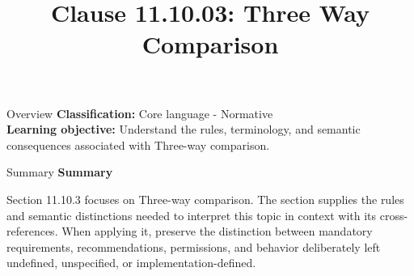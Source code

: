 \documentclass[10pt,letterpaper]{article}
\title{Clause 11.10.03: Three Way Comparison}
\author{}
\date{}
\begin{document}
\maketitle
\begin{CornellOverviewBox}{Overview}
\textbf{Classification:} Core language - Normative\\[2pt]
\textbf{Learning objective:} Understand the rules, terminology, and semantic consequences associated with Three-way comparison.
\end{CornellOverviewBox}\begin{CornellSummaryBox}{Summary}
{\sffamily\bfseries\color{Accent} Summary}\par\vspace{3pt}Section 11.10.3 focuses on Three-way comparison. The section supplies the rules and semantic distinctions needed to interpret this topic in context with its cross-references. When applying it, preserve the distinction between mandatory requirements, recommendations, permissions, and behavior deliberately left undefined, unspecified, or implementation-defined.
\end{CornellSummaryBox}
\end{document}
